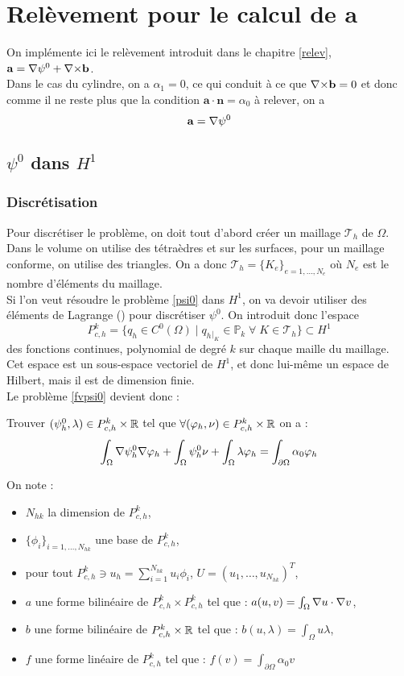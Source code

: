 \chapter{Relèvement pour le calcul de $\mathbf{a}$}
On implémente ici le relèvement introduit dans le chapitre \ref{relev}, $\mathbf{a}={\nabla}\psi^0+{\nabla\times}\mathbf{b}$.\\
Dans le cas du cylindre, on a $\alpha_1=0$, ce qui conduit à ce que ${\nabla\times} \mathbf{b}=0$ et donc comme il ne reste plus que la condition $\mathbf{a}\cdot\mathbf{n}=\alpha_0$ à relever, on a \[ \mathbf{a}={\nabla}\psi^0 \]

\section{$\psi^0$ dans $H^1$}
\subsection{Discrétisation}\label{discGradh1}
Pour discrétiser le problème, on doit tout d'abord créer un maillage $\mathcal{T}_h$ de $\Omega$. Dans le volume on utilise des tétraèdres et sur les surfaces, pour un maillage conforme, on utilise des triangles. On a donc $\mathcal{T}_h=\{K_e\}_{e=1,\dots,N_e}$ où $N_e$ est le nombre d'éléments du maillage.\\
Si l'on veut résoudre le problème \ref{psi0} dans $H^1$, on va devoir utiliser des éléments de Lagrange (\cite{Courant1943}) pour discrétiser $\psi^0$. On introduit donc l'espace
\[   P^k_{c,h} = \{ q_h \in C^0(\Omega) \; |\; q_h{}_{|_K} \in \mathbb{P}_k\; \forall\; K \in \mathcal{T}_h\} \subset H^1 \]
des fonctions continues, polynomial de degré $k$ sur chaque maille du maillage.\\
Cet espace est un sous-espace vectoriel de $H^1$, et donc lui-même un espace de Hilbert, mais il est de dimension finie.\\

Le problème \ref{fvpsi0} devient donc :
\begin{pb}\label{dcpsi0}
Trouver $(\psi^0_h, \lambda)\in P^k_{c,h}\times {\mathbb{R}}$ tel que $\forall (\varphi_h,\nu)\in P^k_{c,h}\times {\mathbb{R}}$ on a :
\[ \int_\Omega{\nabla} \psi^0_h{\nabla}\varphi_h + \int_\Omega \psi^0_h\nu + \int_\Omega \lambda\varphi_h = \int_{\partial\Omega} \alpha_0\varphi_h \]
\end{pb}

On note :
\begin{itemize}
\item $N_{hk}$ la dimension de $P^k_{c,h}$,
\item $\{\phi_i\}_{i=1,\dots,N_{hk}}$ une base de $P^k_{c,h}$,
\item pour tout $P^k_{c,h}\ni u_h=\sum_{i=1}^{N_{hk}} u_i\phi_i$, $U=(u_1,\dots,u_{N_{hk}})^T$,
\item $a$ une forme bilinéaire de $P^k_{c,h}\times P^k_{c,h}$ tel que : $a(u,v)=\int_\Omega {\nabla} u\cdot {\nabla} v$,
\item $b$ une forme bilinéaire de $P^k_{c,h}\times{\mathbb{R}}$ tel que : $b(u,\lambda) = \int_\Omega u\lambda$,
\item $f$ une forme linéaire de $P^k_{c,h}$ tel que : $f(v)=\int_{\partial\Omega} \alpha_0 v$
\end{itemize}

